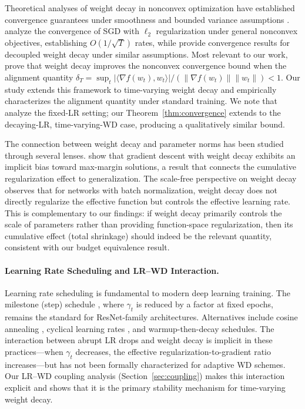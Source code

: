 \documentclass{article}
\begin{document}
Theoretical analyses of weight decay in nonconvex optimization have established
convergence guarantees under smoothness and bounded variance assumptions
\citep{zhuang2022understanding, chen2019convergence}.
\citet{zhuang2022understanding} analyze the convergence of SGD with $\ell_2$
regularization under general nonconvex objectives, establishing $O(1/\sqrt{T})$
rates, while \citet{chen2019convergence} provide convergence results for decoupled
weight decay under similar assumptions.
Most relevant to our work, \citet{xie2024investigating} prove that weight decay
improves the nonconvex convergence bound when the alignment quantity
$\delta_T = \sup_t |\langle \nabla f(w_t), w_t \rangle| /
(\|\nabla f(w_t)\| \|w_t\|) < 1$.
Our study extends this framework to time-varying weight decay and empirically
characterizes the alignment quantity under standard training.
We note that \citet{xie2024investigating} analyze the fixed-LR setting; our
Theorem~\ref{thm:convergence} extends to the decaying-LR, time-varying-WD case,
producing a qualitatively similar bound.

The connection between weight decay and parameter norms has been studied through
several lenses.
\citet{lyu2020gradient} show that gradient descent with weight decay exhibits an
implicit bias toward max-margin solutions, a result that connects the cumulative
regularization effect to generalization.
The scale-free perspective on weight decay \citep{van2017l2} observes that for
networks with batch normalization, weight decay does not directly regularize the
effective function but controls the effective learning rate.
This is complementary to our findings: if weight decay primarily controls the scale
of parameters rather than providing function-space regularization, then its
cumulative effect (total shrinkage) should indeed be the relevant quantity,
consistent with our budget equivalence result.

\paragraph{Learning Rate Scheduling and LR--WD Interaction.}
Learning rate scheduling is fundamental to modern deep learning training.
The milestone (step) schedule \citep{he2016deep}, where $\gamma_t$ is reduced by a
factor at fixed epochs, remains the standard for ResNet-family architectures.
Alternatives include cosine annealing \citep{loshchilov2017sgdr}, cyclical learning
rates \citep{smith2017cyclical}, and warmup-then-decay schedules.
The interaction between abrupt LR drops and weight decay is implicit in these
practices---when $\gamma_t$ decreases, the effective regularization-to-gradient ratio
increases---but has not been formally characterized for adaptive WD schemes.
Our LR--WD coupling analysis (Section~\ref{sec:coupling}) makes this interaction
explicit and shows that it is the primary stability mechanism for time-varying weight
decay.
\end{document}
